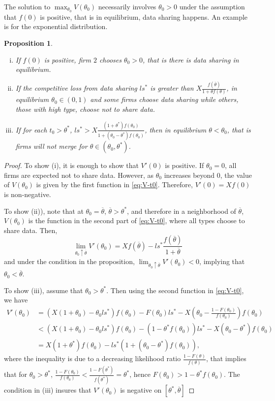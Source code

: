\documentclass[a4paper]{article}
\newtheorem{prop}{Proposition}
\renewcommand{\t}{\theta}
\begin{document}
%
The solution to $\max_{\t_0} V(\t_0)$ necessarily involves $\t_0>0$ under the assumption that $f(0)$ is positive, that is in equilibrium, data sharing happens. An example is for the exponential distribution.
\begin{prop}
  \begin{enumerate}[(i)]\setlength\itemsep{0em}
    \item If $f(0)$ is positive, firm $2$ chooses $\t_0>0$, that is there is data sharing in equilibrium. 
    \item If the competitive loss from data sharing $l s^*$ is greater than $X\frac{f(\overline \t)}{1+\t f(\t)}$, in equilibrium $\t_0\in (0,1)$ and some firms choose data sharing while others, those with high type, choose not to share data.
    \item If for each $t_0>\t^*$, $ls^*>X\frac{(1+\t^*)f(\t_0)}{1+(\t_0-\t^*)f(\t_0)}$, then in equilibrium $\t<\t_0$, that is firms will not merge for $\t\in (\t_0,\t^*)$.
  \end{enumerate}
\end{prop}
\begin{proof}
  To show (i), it is enough to show that $V'(0)$ is positive. If $\t_0=0$, all firms are expected not to share data. However, as $\theta_0$ increases beyond $0$, the value of $V(\t_0)$ is given by the first function in \eqref{eq:V-t0}. Therefore, $V'(0)=Xf(0)$ is non-negative.

  To show (ii)), note that at $\t_0=\overline \t$, $\overline \t>\t^*$, and therefore in a neighborhood of $\overline \t$, $V(\t_0)$ is the function in the second part of \eqref{eq:V-t0}, where all types choose to share data. Then, 
  \[
    \lim_{\t_0\uparrow \overline \t}V'(\t_0)=Xf(\overline \t)-ls^* \frac{f(\overline \t)}{1+\overline \t}
 \]
and under the condition in the proposition, $\lim_{\t_0\uparrow \overline \t}V'(\t_0)<0$, implying that $\t_0<\overline \t$.

To show (iii), assume that $\t_0>\t^*$. Then using the second function in \eqref{eq:V-t0}, we have
\begin{align*}
  V'(\t_0)&=(X(1+\t_0)-\t_0ls^*)f(\t_0)-F(\t_0)l s^*- X\left(\t_0-\frac{1-F(\t_0)}{f(\t_0)}\right)f(\t_0)\\ 
  &<(X(1+\t_0)-\t_0ls^*)f(\t_0)- (1-\t^* f(\t_0)) l s^*- X\left(\t_0-\t^*\right)f(\t_0)\\ 
  &=X(1+\t^*)f(\t_0)-ls^*(1+(\t_0-\t^*)f(\t_0)),
\end{align*}
  where the inequality is due to a decreasing likelihood ratio $\frac{1-F(\t)}{f(\t)}$, that implies that for $\t_0>\t^*$,  $\frac{1-F(\t_0)}{f(\t_0)}<\frac{1-F(\t^*)}{f(\t^*)}=\t^*$, hence $F(\t_0)>1-\t^*f(\t_0)$. The condition in (iii) insures that $V'(\t_0)$ is negative on $[\t^*,\overline \t]$
\end{proof}
\end{document}

